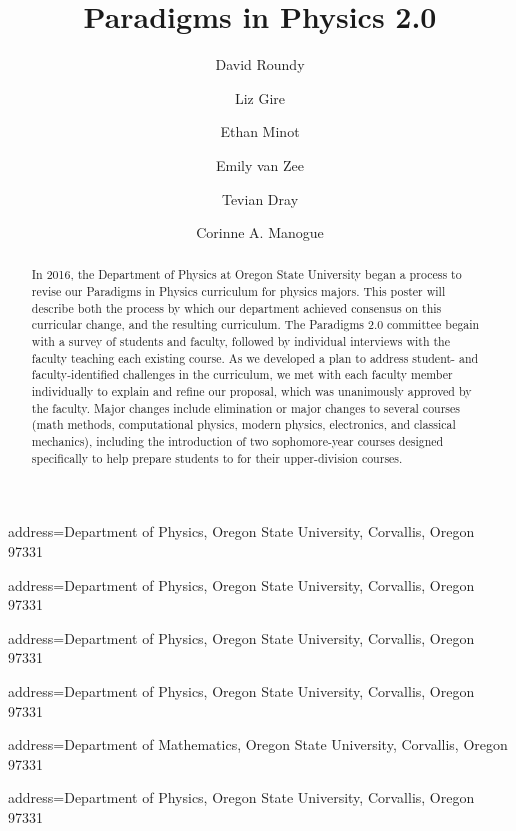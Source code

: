 \documentclass[
    ,final            %
    ,sort&compress
  ]
  {aipproc}
\begin{document}
\title{Paradigms in Physics 2.0}

\classification{} %

\author{David Roundy}{
  address={Department of Physics, Oregon State
    University, Corvallis, Oregon 97331}}
\author{Liz Gire}{
  address={Department of Physics, Oregon State
    University, Corvallis, Oregon 97331}}
\author{Ethan Minot}{
  address={Department of Physics, Oregon State
    University, Corvallis, Oregon 97331}}
\author{Emily van Zee}{
  address={Department of Physics, Oregon State
    University, Corvallis, Oregon 97331}}
\author{Tevian Dray}{
  address={Department of Mathematics, Oregon State
    University, Corvallis, Oregon 97331}}
\author{Corinne A. Manogue}{
  address={Department of Physics, Oregon State
    University, Corvallis, Oregon 97331}}

\newcommand\myderiv[3]{\ensuremath{\left(\dfrac{\partial #1}{\partial #2}\right)_{#3}}}
\newcommand\myderivinline[3]{\ensuremath{(\slfrac{\partial #1}{\partial #2})_{#3}}}
\newcommand\inexactd{d\hspace{-0.9ex}^-\!}

\newcommand\todo[1]{\textcolor{red}{(todo: #1)}}
\newcommand\fixme[1]{\textcolor{red}{(fixme: #1)}}
\newcommand\wording[2][red]{\textcolor{#1}{\underline{#2}}}
\newcommand\wordingnote[3][red]{\textcolor{#1}{\underline{#2}\footnote{#3}}}


\newcommand\dbar{{\mkern6mu\mathchar'26\mkern-12mu d}}

\begin{abstract}
In 2016, the Department of Physics at Oregon State University began a
process to revise our Paradigms in Physics curriculum for physics
majors.  This poster will describe both the process by which our
department achieved consensus on this curricular change, and the
resulting curriculum.  The Paradigms 2.0 committee begain with a
survey of students and faculty, followed by individual interviews with
the faculty teaching each existing course.  As we developed a plan to
address student- and faculty-identified challenges in the curriculum,
we met with each faculty member individually to explain and refine our
proposal, which was unanimously approved by the faculty.  Major
changes include elimination or major changes to several courses (math
methods, computational physics, modern physics, electronics, and
classical mechanics), including the introduction of two sophomore-year
courses designed specifically to help prepare students to for their
upper-division courses.
\end{abstract}
\end{document}
